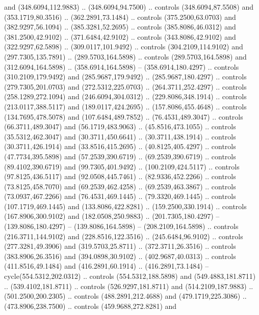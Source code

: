 {{\begin{scope}[y=-0.80pt,x=0.80pt,scale=0.038,xshift=-260pt,yshift=230pt]
        and (348.6094,112.9883) .. (348.6094,94.7500) .. controls (348.6094,87.5508)
        and (353.1719,80.3516) .. (362.2891,73.1484) .. controls (375.2500,63.0703)
        and (382.9297,56.1094) .. (385.3281,52.2695) .. controls (385.8086,46.0312)
        and (381.2500,42.9102) .. (371.6484,42.9102) .. controls (343.8086,42.9102)
        and (322.9297,62.5898) .. (309.0117,101.9492) .. controls (304.2109,114.9102)
        and (297.7305,135.7891) .. (289.5703,164.5898) .. controls (289.5703,164.5898)
        and (312.6094,164.5898) .. (358.6914,164.5898) -- (358.6914,180.4297) ..
        controls (310.2109,179.9492) and (285.9687,179.9492) .. (285.9687,180.4297) ..
        controls (279.7305,201.0703) and (272.5312,225.0703) .. (264.3711,252.4297) ..
        controls (258.1289,272.1094) and (246.6094,304.0312) .. (229.8086,348.1914) ..
        controls (213.0117,388.5117) and (189.0117,424.2695) .. (157.8086,455.4648) ..
        controls (134.7695,478.5078) and (107.6484,489.7852) .. (76.4531,489.3047) ..
        controls (66.3711,489.3047) and (56.1719,483.9063) .. (45.8516,473.1055) ..
        controls (35.5312,462.3047) and (30.3711,450.6641) .. (30.3711,438.1914) ..
        controls (30.3711,426.1914) and (33.8516,415.2695) .. (40.8125,405.4297) ..
        controls (47.7734,395.5898) and (57.2539,390.6719) .. (69.2539,390.6719) ..
        controls (89.4102,390.6719) and (99.7305,401.9492) .. (100.2109,424.5117) ..
        controls (97.8125,436.5117) and (92.0508,445.7461) .. (82.9336,452.2266) ..
        controls (73.8125,458.7070) and (69.2539,462.4258) .. (69.2539,463.3867) ..
        controls (73.0937,467.2266) and (76.4531,469.1445) .. (79.3320,469.1445) ..
        controls (107.1719,469.1445) and (133.8086,422.8281) .. (159.2500,330.1914) ..
        controls (167.8906,300.9102) and (182.0508,250.9883) .. (201.7305,180.4297) --
        (139.8086,180.4297) -- (139.8086,164.5898) -- (208.2109,164.5898) .. controls
        (216.3711,144.9102) and (228.8516,122.3516) .. (245.6484,96.9102) .. controls
        (277.3281,49.3906) and (319.5703,25.8711) .. (372.3711,26.3516) .. controls
        (383.8906,26.3516) and (394.0898,30.9102) .. (402.9687,40.0313) .. controls
        (411.8516,49.1484) and (416.2891,60.1914) .. (416.2891,73.1484) --
        cycle(554.5312,202.0312) .. controls (554.5312,188.5898) and
        (549.4883,181.8711) .. (539.4102,181.8711) .. controls (526.9297,181.8711) and
        (514.2109,187.9883) .. (501.2500,200.2305) .. controls (488.2891,212.4688) and
        (479.1719,225.3086) .. (473.8906,238.7500) .. controls (459.9688,272.8281) and

\end{scope}}}

